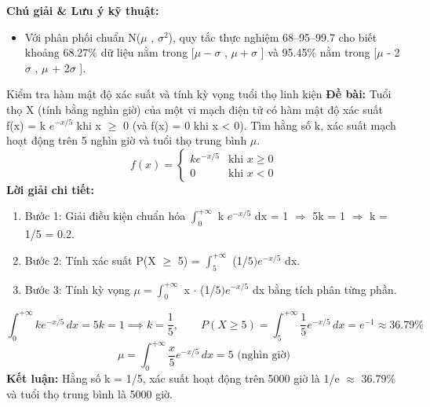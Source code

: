 \documentclass[11pt,a4paper,oneside]{book}
\begin{document}
\noindent\textbf{Chú giải \& Lưu ý kỹ thuật:}
\begin{itemize}[leftmargin=1.5em, itemsep=2pt]
  \item Với phân phối chuẩn N($\mu$ , $\sigma ^2$), quy tắc thực nghiệm 68–95–99.7 cho biết khoảng 68.27\% dữ liệu nằm trong [$\mu - \sigma$ , $\mu + \sigma$ ] và 95.45\% nằm trong [$\mu$  - 2$\sigma$ , $\mu$  + 2$\sigma$ ].
\end{itemize}

\begin{vidu}{Kiểm tra hàm mật độ xác suất và tính kỳ vọng tuổi thọ linh kiện}
\textbf{Đề bài:} Tuổi thọ X (tính bằng nghìn giờ) của một vi mạch điện tử có hàm mật độ xác suất f(x) = k $e^{-x/5}$ khi x $\ge$ 0 (và f(x) = 0 khi x < 0). Tìm hằng số k, xác suất mạch hoạt động trên 5 nghìn giờ và tuổi thọ trung bình $\mu$.
\[ f(x) = \begin{cases} k e^{-x/5} & \text{khi } x \ge 0 \\ 0 & \text{khi } x < 0 \end{cases} \]
\textbf{Lời giải chi tiết:}
\begin{enumerate}[leftmargin=1.5em, itemsep=2pt]
  \item Bước 1: Giải điều kiện chuẩn hóa $\int_0^{+\infty}$ k $e^{-x/5}$ dx = 1 $\Rightarrow$  5k = 1 $\Rightarrow$  k = 1/5 = 0.2.
  \item Bước 2: Tính xác suất P(X $\ge$  5) = $\int_5^{+\infty}$ (1/$5)e^{-x/5}$ dx.
  \item Bước 3: Tính kỳ vọng $\mu = \int_0^{+\infty}$ x $\cdot$  (1/$5)e^{-x/5}$ dx bằng tích phân từng phần.
\end{enumerate}
\[ \int_0^{+\infty} k e^{-x/5}\,dx = 5k = 1 \implies k = \frac{1}{5}, \qquad P(X \ge 5) = \int_5^{+\infty} \frac{1}{5}e^{-x/5}\,dx = e^{-1} \approx 36.79\% \]
\[ \mu = \int_0^{+\infty} \frac{x}{5}e^{-x/5}\,dx = 5 \text{ (nghìn giờ)} \]
\noindent\textbf{Kết luận:} Hằng số k = 1/5, xác suất hoạt động trên 5000 giờ là 1/e $\approx$  36.79\% và tuổi thọ trung bình là 5000 giờ.
\end{vidu}
\end{document}
